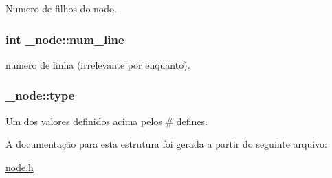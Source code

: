 \label{struct__node_a5f1c09c3697d9a06e1e530441aac18bc}
Numero de filhos do nodo. \hypertarget{struct__node_ad9586487581d158778b8ec89f2fb321d}{
\subsubsection[{num\_\-line}]{\setlength{\rightskip}{0pt plus 5cm}int {\bf \_\-node::num\_\-line}}}
\label{struct__node_ad9586487581d158778b8ec89f2fb321d}
numero de linha (irrelevante por enquanto). \hypertarget{struct__node_a7d8402191946be24896b7517484c2d0b}{
\subsubsection[{type}]{ {\bf \_\-node::type}}}
\label{struct__node_a7d8402191946be24896b7517484c2d0b}
Um dos valores definidos acima pelos \# defines. 

A documentação para esta estrutura foi gerada a partir do seguinte arquivo:\begin{DoxyCompactItemize}
\item 
\hyperlink{node_8h}{node.h}\end{DoxyCompactItemize}
